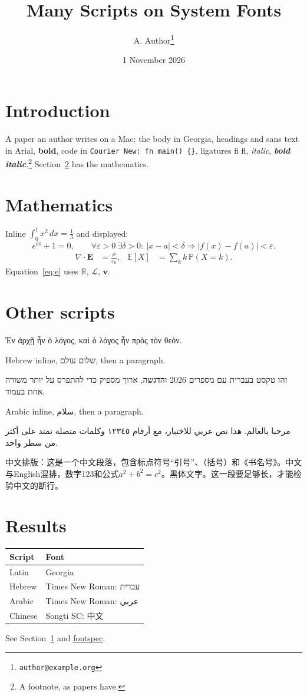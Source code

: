 \documentclass[11pt]{article}
\title{Many Scripts on System Fonts}
\author{A. Author\thanks{\texttt{author@example.org}}}
\date{1 November 2026}
\begin{document}
\maketitle
\tableofcontents

\section{Introduction}\label{s:intro}
A paper an author writes on a Mac: the body in Georgia, headings and
\textsf{sans text in Arial, \textbf{bold}}, code in
\texttt{Courier New: fn main() \{\}}, ligatures fi fl, \textit{italic},
\textbf{\textit{bold italic}}.\footnote{A footnote, as papers have.}
Section~\ref{s:math} has the mathematics.

\section{Mathematics}\label{s:math}
Inline $\int_0^1 x^2\,dx=\frac13$ and displayed:
\begin{equation}\label{eq:e}
  e^{iπ}+1=0,\qquad ∀ε>0\ ∃δ>0:\ |x-a|<δ ⇒ |f(x)-f(a)|<ε .
\end{equation}
\begin{align}
  \nabla\cdot\mathbf{E} &= \frac{ρ}{ε_0}, &
  \mathbb{E}[X] &= \sum_{k} k\,\mathbb{P}(X=k).
\end{align}
Equation~\eqref{eq:e} uses $ℝ$, $\mathcal{L}$, $\symbf{v}$.

\section{Other scripts}\label{s:scripts}
\begin{greek}
Ἐν ἀρχῇ ἦν ὁ λόγος, καὶ ὁ λόγος ἦν πρὸς τὸν θεόν.
\end{greek}

Hebrew inline, \texthebrew{שלום עולם}, then a paragraph.

\begin{hebrew}
זהו טקסט בעברית עם מספרים 2026 ו\textbf{הדגשה}, ארוך מספיק כדי להתפרס על יותר משורה אחת בעמוד.
\end{hebrew}

Arabic inline, \textarabic{سلام}, then a paragraph.

\begin{Arabic}
مرحبا بالعالم. هذا نص عربي للاختبار، مع أرقام ١٢٣٤٥ وكلمات متصلة تمتد على أكثر من سطر واحد.
\end{Arabic}

中文排版：这是一个中文段落，包含标点符号“引号”、（括号）和《书名号》。中文与English混排，数字123和公式$a^2+b^2=c^2$。\textsf{黑体文字。}这一段要足够长，才能检验中文的断行。

\section{Results}
\begin{tabular}{ll}
Script & Font \\ \hline
Latin & Georgia \\
Hebrew & Times New Roman: \texthebrew{עברית} \\
Arabic & Times New Roman: \textarabic{عربي} \\
Chinese & Songti SC: 中文 \\
\end{tabular}

See Section~\ref{s:intro} and \href{https://ctan.org/pkg/fontspec}{fontspec}.
\end{document}
